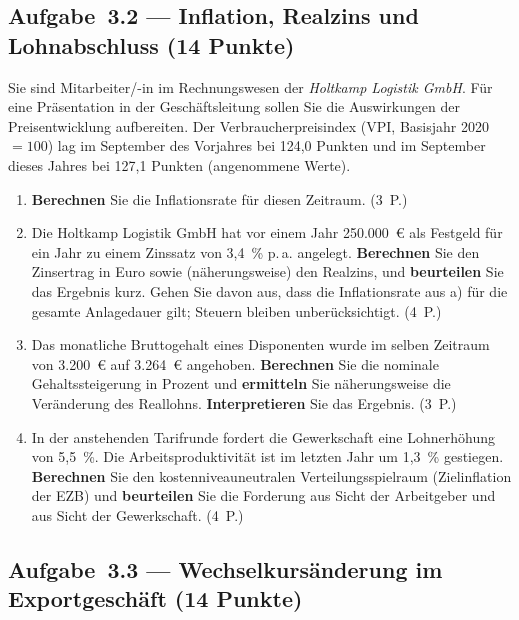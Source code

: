 \subsection*{Aufgabe~3.2 --- Inflation, Realzins und Lohnabschluss (14 Punkte)}

Sie sind Mitarbeiter/-in im Rechnungswesen der \emph{Holtkamp Logistik GmbH}. Für eine
Präsentation in der Geschäftsleitung sollen Sie die Auswirkungen der Preisentwicklung
aufbereiten. Der Verbraucherpreisindex (VPI, Basisjahr 2020~$=100$) lag im September des
Vorjahres bei 124,0 Punkten und im September dieses Jahres bei 127,1 Punkten
(angenommene Werte).

\begin{enumerate}[label=\alph*)]
  \item \textbf{Berechnen} Sie die Inflationsrate für diesen Zeitraum. \hfill (3~P.)
  \item Die Holtkamp Logistik GmbH hat vor einem Jahr 250.000~€ als Festgeld für ein Jahr
    zu einem Zinssatz von 3,4~\% p.\,a. angelegt. \textbf{Berechnen} Sie den Zinsertrag in
    Euro sowie (näherungsweise) den Realzins, und \textbf{beurteilen} Sie das Ergebnis
    kurz. Gehen Sie davon aus, dass die Inflationsrate aus a) für die gesamte
    Anlagedauer gilt; Steuern bleiben unberücksichtigt. \hfill (4~P.)
  \item Das monatliche Bruttogehalt eines Disponenten wurde im selben Zeitraum von
    3.200~€ auf 3.264~€ angehoben. \textbf{Berechnen} Sie die nominale Gehaltssteigerung
    in Prozent und \textbf{ermitteln} Sie näherungsweise die Veränderung des Reallohns.
    \textbf{Interpretieren} Sie das Ergebnis. \hfill (3~P.)
  \item In der anstehenden Tarifrunde fordert die Gewerkschaft eine Lohnerhöhung von
    5,5~\%. Die Arbeitsproduktivität ist im letzten Jahr um 1,3~\% gestiegen.
    \textbf{Berechnen} Sie den kostenniveauneutralen Verteilungsspielraum (Zielinflation
    der EZB) und \textbf{beurteilen} Sie die Forderung aus Sicht der Arbeitgeber und aus
    Sicht der Gewerkschaft. \hfill (4~P.)
\end{enumerate}

\subsection*{Aufgabe~3.3 --- Wechselkursänderung im Exportgeschäft (14 Punkte)}

